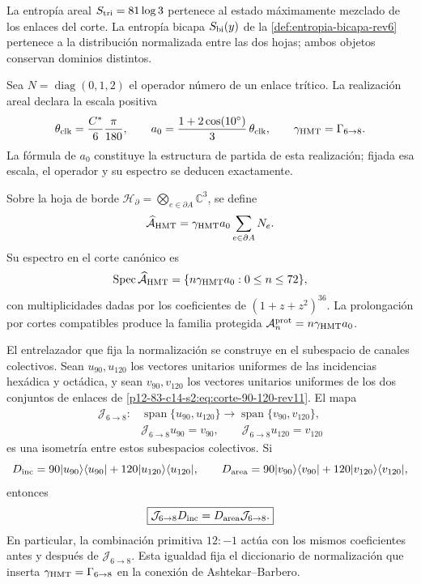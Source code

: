 La entropía areal \(S_{\rm tri}=81\log3\) pertenece al estado máximamente
mezclado de los enlaces del corte. La entropía bicapa
\(S_{\rm bi}(y)\) de la \cref{def:entropia-bicapa-rev6} pertenece a la
distribución normalizada entre las dos hojas; ambos objetos conservan
dominios distintos.

Sea \(N=\operatorname{diag}(0,1,2)\) el operador número de un enlace trítico.
La realización areal declara la escala positiva
\[
 \theta_{\rm clk}=\frac{C^*}{6}\frac{\pi}{180},
 \qquad
 a_0=\frac{1+2\cos(10^\circ)}{3}\,\theta_{\rm clk},
 \qquad \gamma_{\rm HMT}=\Gamma_{6\to8}.
\]
La fórmula de \(a_0\) constituye la estructura de partida de esta
realización; fijada esa escala, el operador y su espectro se deducen
exactamente.

\begin{definition}
Sobre la hoja de borde
\(\mathcal H_{\partial}=\bigotimes_{e\in\partial A}\mathbb C^3\), se define
\begin{equation}
 \widehat{\mathcal A}_{\rm HMT}
 =\gamma_{\rm HMT}a_0\sum_{e\in\partial A}N_e.
 \label{p12-83-c14-s2:eq:operador-area-hmt-rev11}
\end{equation}
Su espectro en el corte canónico es
\[
 \operatorname{Spec}\widehat{\mathcal A}_{\rm HMT}
 =\{n\gamma_{\rm HMT}a_0:0\leq n\leq72\},
\]
con multiplicidades dadas por los coeficientes de
\((1+z+z^2)^{36}\). La prolongación por cortes compatibles produce la
familia protegida \(\mathcal A_n^{\rm prot}=n\gamma_{\rm HMT}a_0\).
\end{definition}

El entrelazador que fija la normalización se construye en el subespacio de
canales colectivos. Sean \(u_{90},u_{120}\) los vectores unitarios uniformes
de las incidencias hexádica y octádica, y sean \(v_{90},v_{120}\) los
vectores unitarios uniformes de los dos conjuntos de enlaces de
\eqref{p12-83-c14-s2:eq:corte-90-120-rev11}. El mapa
\begin{equation}
 \begin{aligned}
 \mathcal J_{6\to8}:{}
 &\operatorname{span}\{u_{90},u_{120}\}
 \longrightarrow
 \operatorname{span}\{v_{90},v_{120}\},\\
 &\mathcal J_{6\to8}u_{90}=v_{90},
 \qquad
 \mathcal J_{6\to8}u_{120}=v_{120}
 \end{aligned}
 \label{p12-83-c14-s2:eq:entrelazador-area-barbero-rev11}
\end{equation}
es una isometría entre estos subespacios colectivos. Si
\[
 D_{\rm inc}=90|u_{90}\rangle\langle u_{90}|
 +120|u_{120}\rangle\langle u_{120}|,
 \qquad
 D_{\rm area}=90|v_{90}\rangle\langle v_{90}|
 +120|v_{120}\rangle\langle v_{120}|,
\]
entonces
\[
 \boxed{\mathcal J_{6\to8}D_{\rm inc}
 =D_{\rm area}\mathcal J_{6\to8}.}
\]
En particular, la combinación primitiva \(12:-1\) actúa
con los mismos coeficientes antes y después de \(\mathcal J_{6\to8}\). Esta
igualdad fija el diccionario de normalización que inserta
\(\gamma_{\rm HMT}=\Gamma_{6\to8}\) en la conexión de
Ashtekar--Barbero.

